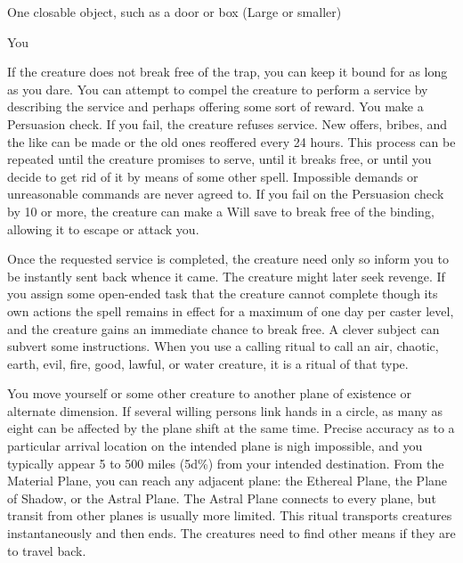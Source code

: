 \begin{spelltarget}{One closable object, such as a door or box (Large or smaller)}
\begin{spelltarget}{You}
\par If the creature does not break free of the trap, you can keep it bound for as long as you dare. You can attempt to compel the creature to perform a service by describing the service and perhaps offering some sort of reward. You make a Persuasion check. If you fail, the creature refuses service. New offers, bribes, and the like can be made or the old ones reoffered every 24 hours. This process can be repeated until the creature promises to serve, until it breaks free, or until you decide to get rid of it by means of some other spell. Impossible demands or unreasonable commands are never agreed to. If you fail on the Persuasion check by 10 or more, the creature can make a Will save to break free of the binding, allowing it to escape or attack you.
\par Once the requested service is completed, the creature need only so inform you to be instantly sent back whence it came. The creature might later seek revenge. If you assign some open-ended task that the creature cannot complete though its own actions the spell remains in effect for a maximum of one day per caster level, and the creature gains an immediate chance to break free.
\spellnotes A clever subject can subvert some instructions. When you use a calling ritual to call an air, chaotic, earth, evil, fire, good, lawful, or water creature, it is a ritual of that type.

\spelleffect You move yourself or some other creature to another plane of existence or alternate dimension. If several willing persons link hands in a circle, as many as eight can be affected by the plane shift at the same time. Precise accuracy as to a particular arrival location on the intended plane is nigh impossible, and you typically appear 5 to 500 miles (5d\%) from your intended destination. From the Material Plane, you can reach any adjacent plane: the Ethereal Plane, the Plane of Shadow, or the Astral Plane. The Astral Plane connects to every plane, but transit from other planes is usually more limited.
\spellnotes This ritual transports creatures instantaneously and then ends. The creatures need to find other means if they are to travel back.


\end{spelltarget}
\end{spelltarget}
